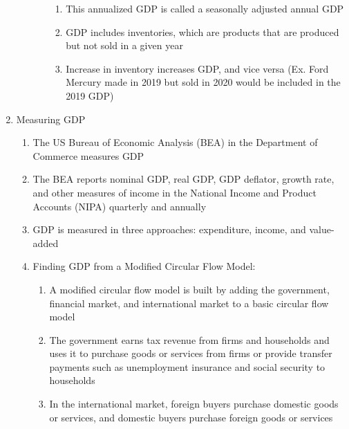 \documentclass[12pt]{article}
\begin{document}
\begin{enumerate}
\begin{enumerate}
\begin{enumerate}
\begin{enumerate}
                  \item This annualized GDP is called a seasonally adjusted annual GDP

                  \item GDP includes inventories, which are products that are produced but not sold in a given year

                  \item Increase in inventory increases GDP, and vice versa (Ex. Ford Mercury made in 2019 but sold in 2020 would be included in the 2019 GDP)

                \end{enumerate}

            \end{enumerate}

        \end{enumerate}

      \item Measuring GDP

        \begin{enumerate}

          \item The US Bureau of Economic Analysis (BEA) in the Department of Commerce measures GDP

          \item The BEA reports nominal GDP, real GDP, GDP deflator, growth rate, and other measures of income in the National Income and Product Accounts (NIPA) quarterly and annually

          \item GDP is measured in three approaches: expenditure, income, and value-added

          \item Finding GDP from a Modified Circular Flow Model:

            \begin{enumerate}

              \item A modified circular flow model is built by adding the government, financial market, and international market to a basic circular flow model

              \item The government earns tax revenue from firms and households and uses it to purchase goods or services from firms or provide transfer payments such as unemployment insurance and social security to households

              \item In the international market, foreign buyers purchase domestic goods or services, and domestic buyers purchase foreign goods or services


\end{enumerate}
\end{enumerate}
\end{enumerate}
\end{document}
